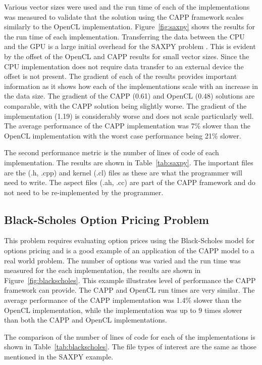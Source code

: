 \documentclass{sig-alternate-05-2015}
\begin{document}
Various vector sizes were used and the run time of each of the implementations
was measured to validate that the solution using the
 CAPP framework scales similarly to the OpenCL implementation. Figure~\ref{fig:saxpy} 
shows the results for the run time of each implementation. Transferring
the data between the CPU and the GPU is a large initial overhead for the SAXPY problem
\cite{gregg:saxpy}. This is evident by the offset of the
OpenCL and CAPP results for small vector sizes. Since the CPU implementation
does not require data transfer to an external device the offset is not present.
The gradient of each of the results provides important information as it shows
how each of the implementations scale with an increase in the data size. 
The gradient of the CAPP (0.61) and OpenCL (0.48) solutions are comparable, with
the CAPP solution being slightly worse. The gradient of the \CPP
implementation (1.19) is considerably worse and does not scale particularly
well. The average performance of the CAPP implementation was 7\% slower
than the OpenCL implementation with the worst case performance being 21\%
slower.

The second performance metric is the number of lines
of code of each implementation. The results are shown in 
Table~\ref{tab:saxpy}. The important files are the \CPP (.h, .cpp) and kernel (.cl)
files as these are what the programmer will need to write. The aspect files (.ah, .cc) are
part of the  CAPP framework and do not need to be re-implemented by the programmer. 

\subsection{Black-Scholes Option Pricing Problem}

This problem requires evaluating option prices using the Black-Scholes 
model for options pricing and is a good example of an application of the CAPP 
model to a real world problem. The number of options was varied and the
run time was measured for the each implementation, the results are shown in 
Figure~\ref{fig:blackscholes}. 
This example illustrates level of performance the  CAPP framework can
provide. The CAPP and OpenCL run times are very similar. The average 
performance of the CAPP implementation was 1.4\% slower than the
OpenCL implementation, while the \CPP implementation was up to 9 times slower
than both the CAPP and OpenCL implementations.

The comparison of the number of lines of code for each of the implementations is
shown in Table~\ref{tab:blackscholes}. The file types of interest are the same as 
those mentioned in the SAXPY example. 
\end{document}
